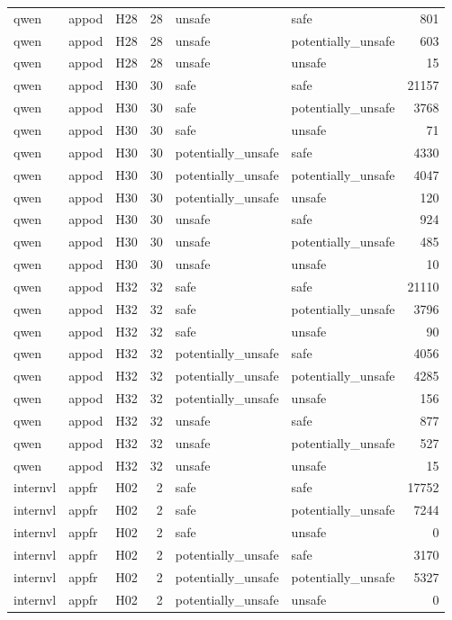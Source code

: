 \begin{table}[tbp]
\begin{tabular}{lllrllr}
qwen & appod & H28 & 28 & unsafe & safe & 801 \\
qwen & appod & H28 & 28 & unsafe & potentially\_unsafe & 603 \\
qwen & appod & H28 & 28 & unsafe & unsafe & 15 \\
qwen & appod & H30 & 30 & safe & safe & 21157 \\
qwen & appod & H30 & 30 & safe & potentially\_unsafe & 3768 \\
qwen & appod & H30 & 30 & safe & unsafe & 71 \\
qwen & appod & H30 & 30 & potentially\_unsafe & safe & 4330 \\
qwen & appod & H30 & 30 & potentially\_unsafe & potentially\_unsafe & 4047 \\
qwen & appod & H30 & 30 & potentially\_unsafe & unsafe & 120 \\
qwen & appod & H30 & 30 & unsafe & safe & 924 \\
qwen & appod & H30 & 30 & unsafe & potentially\_unsafe & 485 \\
qwen & appod & H30 & 30 & unsafe & unsafe & 10 \\
qwen & appod & H32 & 32 & safe & safe & 21110 \\
qwen & appod & H32 & 32 & safe & potentially\_unsafe & 3796 \\
qwen & appod & H32 & 32 & safe & unsafe & 90 \\
qwen & appod & H32 & 32 & potentially\_unsafe & safe & 4056 \\
qwen & appod & H32 & 32 & potentially\_unsafe & potentially\_unsafe & 4285 \\
qwen & appod & H32 & 32 & potentially\_unsafe & unsafe & 156 \\
qwen & appod & H32 & 32 & unsafe & safe & 877 \\
qwen & appod & H32 & 32 & unsafe & potentially\_unsafe & 527 \\
qwen & appod & H32 & 32 & unsafe & unsafe & 15 \\
internvl & appfr & H02 & 2 & safe & safe & 17752 \\
internvl & appfr & H02 & 2 & safe & potentially\_unsafe & 7244 \\
internvl & appfr & H02 & 2 & safe & unsafe & 0 \\
internvl & appfr & H02 & 2 & potentially\_unsafe & safe & 3170 \\
internvl & appfr & H02 & 2 & potentially\_unsafe & potentially\_unsafe & 5327 \\
internvl & appfr & H02 & 2 & potentially\_unsafe & unsafe & 0 \\

\end{tabular}
\end{table}
